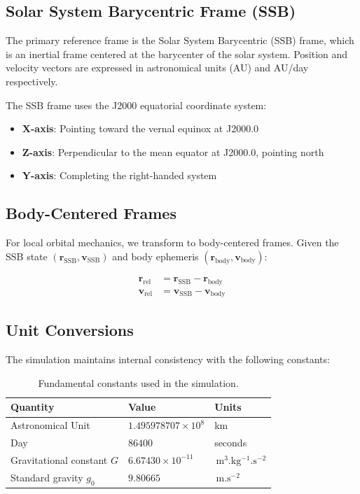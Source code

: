 \documentclass[11pt,a4paper]{article}
\newcommand{\vect}[1]{\bm{#1}}
\newcommand{\si}[1]{\,\mathrm{#1}}
\begin{document}
\subsection{Solar System Barycentric Frame (SSB)}

The primary reference frame is the Solar System Barycentric (SSB) frame, which is an inertial frame centered at the barycenter of the solar system. Position and velocity vectors are expressed in astronomical units (AU) and AU/day respectively.

The SSB frame uses the J2000 equatorial coordinate system:
\begin{itemize}
    \item \textbf{X-axis}: Pointing toward the vernal equinox at J2000.0
    \item \textbf{Z-axis}: Perpendicular to the mean equator at J2000.0, pointing north
    \item \textbf{Y-axis}: Completing the right-handed system
\end{itemize}

\subsection{Body-Centered Frames}

For local orbital mechanics, we transform to body-centered frames. Given the SSB state $(\vect{r}_\text{SSB}, \vect{v}_\text{SSB})$ and body ephemeris $(\vect{r}_\text{body}, \vect{v}_\text{body})$:

\begin{align}
    \vect{r}_\text{rel} &= \vect{r}_\text{SSB} - \vect{r}_\text{body} \\
    \vect{v}_\text{rel} &= \vect{v}_\text{SSB} - \vect{v}_\text{body}
\end{align}

\subsection{Unit Conversions}

The simulation maintains internal consistency with the following constants:

\begin{table}[h]
\centering
\begin{tabular}{lll}
\toprule
\textbf{Quantity} & \textbf{Value} & \textbf{Units} \\
\midrule
Astronomical Unit & $1.495978707 \times 10^{8}$ & km \\
Day & $86400$ & seconds \\
Gravitational constant $G$ & $6.67430 \times 10^{-11}$ & $\si{m^3.kg^{-1}.s^{-2}}$ \\
Standard gravity $g_0$ & $9.80665$ & $\si{m.s^{-2}}$ \\
\bottomrule
\end{tabular}
\caption{Fundamental constants used in the simulation.}
\label{tab:constants}
\end{table}
\end{document}

